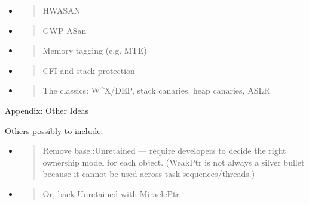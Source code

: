 \documentclass[a4paper,12pt,notitlepage,twoside,openright]{article}
\begin{document}
{\begin{itemize}
\item
  \begin{quote}
  HWASAN
  \end{quote}
\item
  \begin{quote}
  GWP-ASan
  \end{quote}
\item
  \begin{quote}
  Memory tagging (e.g. MTE)
  \end{quote}
\item
  \begin{quote}
  CFI and stack protection
  \end{quote}
\item
  \begin{quote}
  The classics: W\^{}X/DEP, stack canaries, heap canaries, ASLR
  \end{quote}
\end{itemize}

Appendix: Other Ideas

Others possibly to include:

\begin{itemize}
\item
  \begin{quote}
  Remove base::Unretained --- require developers to decide the
  right ownership model for each object. (WeakPtr is not always a silver
  bullet because it cannot be used across task sequences/threads.)
  \end{quote}
\end{itemize}

\begin{itemize}
\item
  \begin{quote}
  Or, back Unretained with MiraclePtr.
  \end{quote}
\end{itemize}

}
\end{document}
